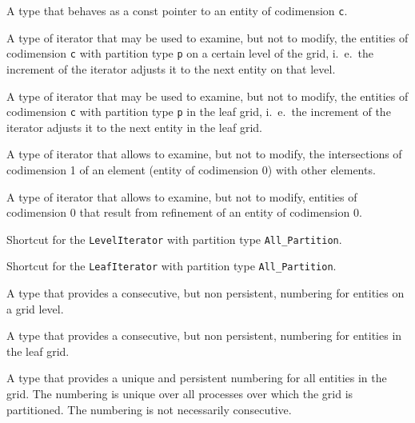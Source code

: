 \documentclass[11pt,a4paper,headinclude,footinclude,DIV14,BCOR8.25mm,titlepage,twoside,openright,normalheadings]{scrreprt}
\begin{document}
A type that behaves as a const pointer to an entity of
codimension \lstinline!c!.

A type of iterator that may be used to examine, but not to modify, the
entities of codimension \lstinline!c! with partition type
\lstinline!p! on a certain level of the grid, i.~e.~the increment of
the iterator adjusts it to the next entity on that level.


A type of iterator that may be used to examine, but not to modify, the
entities of codimension \lstinline!c! with partition type
\lstinline!p! in the leaf grid, i.~e.~the increment of
the iterator adjusts it to the next entity in the leaf grid. 

A type of iterator that allows to examine, but not to modify, the
intersections of codimension 1 of an element (entity of codimension 0)
with other elements.

A type of iterator that allows to examine, but not to modify, entities
of codimension 0 that result from refinement of an entity of
codimension 0.

Shortcut for the \lstinline!LevelIterator! with partition type
\lstinline!All_Partition!. 

Shortcut for the \lstinline!LeafIterator! with partition type
\lstinline!All_Partition!. 


A type that provides a consecutive, but non persistent, numbering for
entities on a grid level. 

A type that provides a consecutive, but non persistent, numbering for
entities in the leaf grid. 

A type that provides a unique and persistent numbering for
all entities in the grid. The numbering is unique over all processes
over which the grid is partitioned. The numbering is not necessarily
consecutive.  
\end{document}
